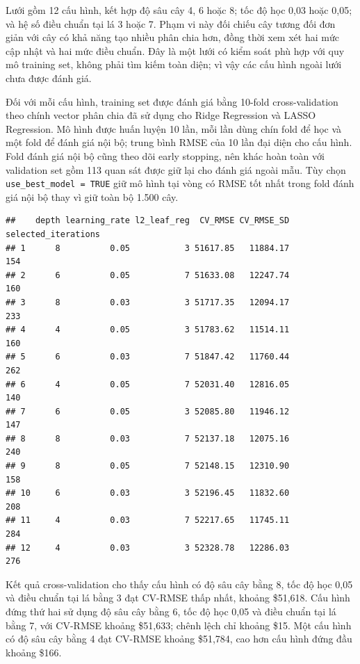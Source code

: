 Lưới gồm 12 cấu hình, kết hợp độ sâu cây 4, 6 hoặc 8; tốc độ học 0,03
hoặc 0,05; và hệ số điều chuẩn tại lá 3 hoặc 7. Phạm vi này đối chiếu
cây tương đối đơn giản với cây có khả năng tạo nhiều phân chia hơn, đồng
thời xem xét hai mức cập nhật và hai mức điều chuẩn. Đây là một lưới có
kiểm soát phù hợp với quy mô training set, không phải tìm kiếm toàn
diện; vì vậy các cấu hình ngoài lưới chưa được đánh giá.

Đối với mỗi cấu hình, training set được đánh giá bằng 10-fold
cross-validation theo chính vector phân chia đã sử dụng cho Ridge
Regression và LASSO Regression. Mô hình được huấn luyện 10 lần, mỗi lần
dùng chín fold để học và một fold để đánh giá nội bộ; trung bình RMSE
của 10 lần đại diện cho cấu hình. Fold đánh giá nội bộ cũng theo dõi
early stopping, nên khác hoàn toàn với validation set gồm 113 quan sát
được giữ lại cho đánh giá ngoài mẫu. Tùy chọn
\texttt{use\_best\_model\ =\ TRUE} giữ mô hình tại vòng có RMSE tốt nhất
trong fold đánh giá nội bộ thay vì giữ toàn bộ 1.500 cây.

\begin{verbatim}
##    depth learning_rate l2_leaf_reg  CV_RMSE CV_RMSE_SD selected_iterations
## 1      8          0.05           3 51617.85   11884.17                 154
## 2      6          0.05           7 51633.08   12247.74                 160
## 3      8          0.03           3 51717.35   12094.17                 233
## 4      4          0.05           3 51783.62   11514.11                 160
## 5      6          0.03           7 51847.42   11760.44                 262
## 6      4          0.05           7 52031.40   12816.05                 140
## 7      6          0.05           3 52085.80   11946.12                 147
## 8      8          0.03           7 52137.18   12075.16                 240
## 9      8          0.05           7 52148.15   12310.90                 158
## 10     6          0.03           3 52196.45   11832.60                 208
## 11     4          0.03           7 52217.65   11745.11                 284
## 12     4          0.03           3 52328.78   12286.03                 276
\end{verbatim}

Kết quả cross-validation cho thấy cấu hình có độ sâu cây bằng 8, tốc độ
học 0,05 và điều chuẩn tại lá bằng 3 đạt CV-RMSE thấp nhất, khoảng
\$51,618. Cấu hình đứng thứ hai sử dụng độ sâu cây bằng 6, tốc độ học
0,05 và điều chuẩn tại lá bằng 7, với CV-RMSE khoảng \$51,633; chênh
lệch chỉ khoảng \$15. Một cấu hình có độ sâu cây bằng 4 đạt CV-RMSE
khoảng \$51,784, cao hơn cấu hình đứng đầu khoảng \$166.

